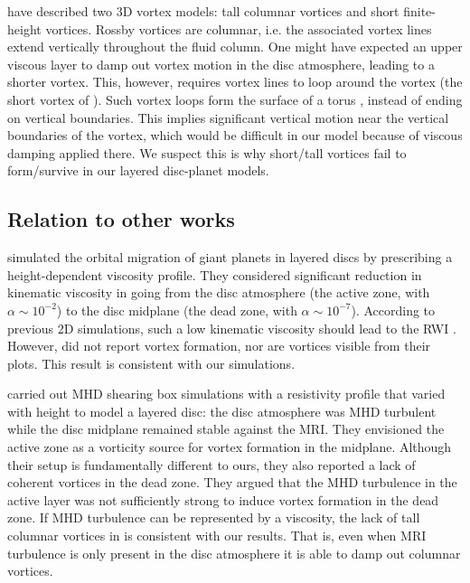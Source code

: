 \cite{barranco05} have described two 
3D vortex models: tall columnar vortices and short finite-height vortices. 
Rossby vortices are columnar, i.e. the associated vortex lines
extend vertically throughout the fluid column. One might have expected
an upper viscous layer to damp out vortex motion in the disc atmosphere, leading to a shorter
vortex. This, however, requires vortex lines to loop around the
vortex (the short vortex of \citeauthor{barranco05}). Such  
vortex loops form the surface of a torus \citep[see, for 
  example, Fig. 1 in][]{barranco05}, instead of ending on 
vertical boundaries. This implies significant vertical
motion near the vertical boundaries of the vortex, which would be  
difficult in our model because of viscous damping applied there. We
suspect this is why short/tall vortices fail to form/survive in our
layered disc-planet models.     


\subsection{Relation to other works}
\cite{pierens10} simulated the orbital migration of giant planets in
layered discs by prescribing a height-dependent viscosity profile. They
considered significant reduction in kinematic viscosity in going from
the disc atmosphere (the active zone, with $\alpha\sim10^{-2}$) to the
disc midplane (the dead zone, with $\alpha\sim10^{-7}$). According to
previous 2D simulations, such a low kinematic viscosity should lead to
the RWI \citep{valborro06,valborro07}. However, \citeauthor{pierens10}
did not report vortex formation, nor are vortices visible from their
plots. This result is consistent with our simulations. 

\cite{oishi09} carried out MHD shearing box simulations with 
a resistivity profile that varied with height to model a
layered disc: the disc atmosphere was MHD turbulent while the disc
midplane remained stable against the MRI. They envisioned the active
zone as a vorticity source for vortex formation in the midplane.  
Although their setup is fundamentally different to ours, they also
reported a lack of coherent vortices in the dead zone. They argued
that the MHD turbulence in the active layer was not sufficiently strong
to induce vortex formation in the dead zone. If MHD turbulence can be
represented by a viscosity, the lack of tall columnar vortices in
\citeauthor{oishi09} is consistent with our results. That is,
even when MRI turbulence is only present in the disc atmosphere it is
able to damp out columnar vortices.     

